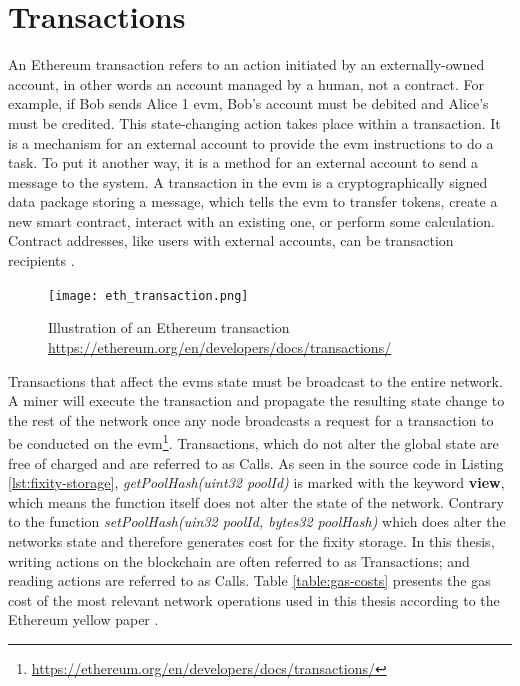 \documentclass[final]{vutinfth}
\begin{document}
\section{Transactions}\label{sec:tx-cost}
An Ethereum transaction refers to an action initiated by an externally-owned account, in other words an account managed by a human, not a contract. For example, if Bob sends Alice 1 \acrshort{evm}, Bob's account must be debited and Alice's must be credited. This state-changing action takes place within a transaction. It is a mechanism for an external account to provide the \acrshort{evm} instructions to do a task. To put it another way, it is a method for an external account to send a message to the system. A transaction in the \acrshort{evm} is a cryptographically signed data package storing a message, which tells the \acrshort{evm} to transfer tokens, create a new smart contract, interact with an existing one, or perform some calculation. Contract addresses, like users with external accounts, can be transaction recipients \cite[60]{dannen2017introducing}. 
\begin{figure}[t]
    \centering
    \texttt{[image: eth\_transaction.png]}
    \caption{Illustration of an Ethereum transaction \url{https://ethereum.org/en/developers/docs/transactions/}}
\end{figure}
Transactions that affect the \acrshort{evm}s state must be broadcast to the entire network. A miner will execute the transaction and propagate the resulting state change to the rest of the network once any node broadcasts a request for a transaction to be conducted on the \acrshort{evm}\footnote{\url{https://ethereum.org/en/developers/docs/transactions/}}.
Transactions, which do not alter the global state are free of charged and are referred to as Calls. As seen in the source code in Listing \ref{lst:fixity-storage}, \textit{getPoolHash(uint32 poolId)} is marked with the keyword \textbf{view}, which means the function itself does not alter the state of the network. Contrary to the function \textit{setPoolHash(uin32 poolId, bytes32 poolHash)} which does alter the networks state and therefore generates cost for the fixity storage. In this thesis, writing actions on the blockchain are often referred to as Transactions; and reading actions are referred to as Calls.
Table \ref{table:gas-costs} presents the gas cost of the most relevant network operations used in this thesis according to the Ethereum yellow paper \cite[27]{wood2014ethereum}.
\end{document}
